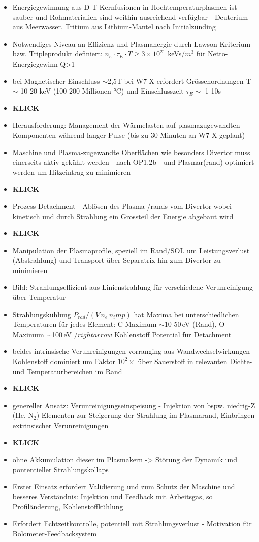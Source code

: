 \documentclass[11pt,a4paper]{article}
\begin{document}
\begin{itemize}
\item Energiegewinnung aus D-T-Kernfusionen in Hochtemperaturplasmen ist sauber und Rohmaterialien sind weithin ausreichend verfügbar - Deuterium aus Meerwasser, Tritium aus Lithium-Mantel nach Initialzünding
\item Notwendiges Niveau an Effizienz und Plasmanergie durch Lawson-Kriterium bzw. Tripleprodukt definiert: $ n_e\cdot\tau_E\cdot T\geq3\times10^{21} $ keVs/$m^3$ für Netto-Energiegewinn Q>1
\item bei Magnetischer Einschluss $\sim$2,5T bei W7-X erfordert Grössenordnungen T $\sim$ 10-20 keV (100-200 Millionen °C) und Einschlusszeit $\tau_E\sim$ 1-10s
\item \textbf{KLICK}
\item Herausforderung: Management der Wärmelasten auf plasmazugewandten Komponenten während langer Pulse (bis zu 30 Minuten an W7-X geplant)
\item Maschine und Plasma-zugewandte Oberflächen wie besonders Divertor muss einerseits aktiv gekühlt werden - nach OP1.2b - und Plasmar(rand) optimiert werden um Hitzeintrag zu minimieren
\item \textbf{KLICK}
\item Prozess Detachment - Ablösen des Plasma-/rands vom Divertor wobei kinetisch und durch Strahlung ein Grossteil der Energie abgebaut wird
\item \textbf{KLICK}
\item Manipulation der Plasmaprofile, speziell im Rand/SOL um Leistungsverlust (Abstrahlung) und Transport über Separatrix hin zum Divertor zu minimieren
\item Bild: Strahlungseffizient aus Linienstrahlung für verschiedene Verunreinigung über Temperatur
\item Strahlungskühlung $P_{rad}/(V\,n_e\,n_imp)$ hat Maxima bei unterschiedlichen Temperaturen für jedes Element: C Maximum $\sim$10-50\,eV (Rand), O Maximum $\sim$100\,eV $/rightarrow$ Kohlenstoff Potential für Detachment
\item beides intrinsische Verunreinigungen vorranging aus Wandwechselwirkungen - Kohlenstoff dominiert um Faktor $10^2\times$ über Sauerstoff in relevanten Dichte- und Temperaturbereichen im Rand
\item \textbf{KLICK}
\item genereller Ansatz: Verunreinigungseinspeisung - Injektion von bspw. niedrig-Z (He, N$_2$) Elementen zur Steigerung der Strahlung im Plasmarand, Einbringen extrinsischer Verunreinigungen
\item \textbf{KLICK}
\item ohne Akkumulation dieser im Plasmakern -> Störung der Dynamik und pontentieller Strahlungskollaps
\item Erster Einsatz erfordert Validierung und zum Schutz der Maschine und besseres Verständnis: Injektion und Feedback mit Arbeitsgas, so Profiländerung, Kohlenstoffkühlung
\item Erfordert Echtzeitkontrolle, potentiell mit Strahlungsverlust - Motivation für Bolometer-Feedbacksystem
\end{itemize}
\end{document}
